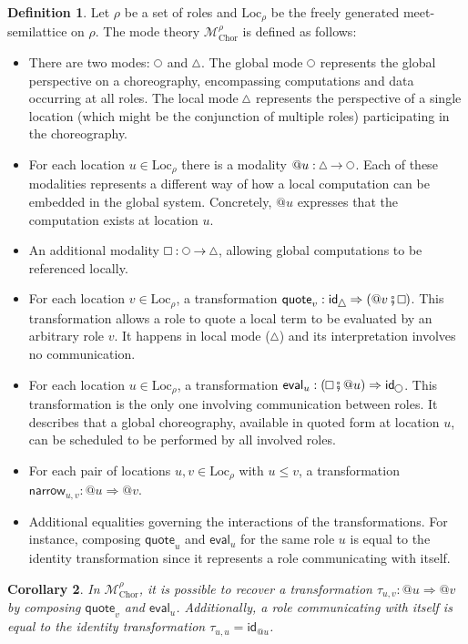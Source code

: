 \documentclass{scrartcl}
\theoremstyle{definition}
\newtheorem{definition}{Definition}
\theoremstyle{plain}
\newtheorem{corollary}[definition]{Corollary}
\renewcommand{\square}%
  {\tikz{\draw (0,0) rectangle (0.2cm,0.2cm);}}
\renewcommand{\circle}%
  {\tikz{\draw (0,0) circle [radius=0.1cm];}}
\renewcommand{\triangle}%
  {\tikz{\draw (0,0) -- (0.2cm,0) -- (0.1cm,0.2cm) -- (0,0);}}
\begin{document}
\begin{definition}
Let $\rho$ be a set of roles and $\textrm{Loc}_\rho$ be the freely generated
meet-semilattice on $\rho$. The mode theory $\mathcal{M}^\rho_{\textrm{Chor}}$
is defined as follows:
\begin{itemize}
\item
  There are two modes: $\circle$ and $\triangle$. The global mode $\circle$
  represents the global perspective on a choreography, encompassing
  computations and data occurring at all roles. The local mode $\triangle$
  represents the perspective of a single location (which might be the
  conjunction of multiple roles) participating in the choreography.
\item
  For each location $u \in \textrm{Loc}_\rho$ there is a modality $@u :
  \triangle \to \circle$. Each of these modalities represents a different way
  of how a local computation can be embedded in the global system. Concretely,
  $@u$ expresses that the computation exists at location $u$.
\item
  An additional modality $\square : \circle \to \triangle$, allowing global
  computations to be referenced locally.
\item
  For each location $v \in \textrm{Loc}_\rho$, a transformation
  $\textsf{quote}_v : \textsf{id}_{\triangle} \Rightarrow ({}@ v \fatsemi
  \square)$. This transformation allows a role to quote a local term to be
  evaluated by an arbitrary role $v$. It happens in local mode ($\triangle$)
  and its interpretation involves no communication.
\item
  For each location $u \in \textrm{Loc}_\rho$, a transformation
  $\textsf{eval}_u : (\square \fatsemi {}@ u) \Rightarrow
  \textsf{id}_{\circle}$. This transformation is the only one involving
  communication between roles. It describes that a global choreography,
  available in quoted form at location $u$, can be scheduled to be performed by
  all involved roles.
\item
  For each pair of locations $u, v \in \textrm{Loc}_\rho$ with $u \leq v$, a
  transformation $\textsf{narrow}_{u,v} : @u \Rightarrow @v$.
\item
  Additional equalities governing the interactions of the transformations. For
  instance, composing $\textsf{quote}_u$ and $\textsf{eval}_u$ for the same
  role $u$ is equal to the identity transformation since it represents a
  role communicating with itself.
\end{itemize}
\end{definition}
\begin{corollary}
  In {\upshape$\mathcal{M}^{\rho}_{\textrm{Chor}}$}, it is possible to recover
  a transformation $\tau_{u,v} : @u \Rightarrow @v$ by composing
  {\upshape$\textsf{quote}_v$} and {\upshape$\textsf{eval}_u$}. Additionally, a
  role communicating with itself is equal to the identity transformation
  {\upshape$\tau_{u,u} = \textsf{id}_{@u}$}.
\end{corollary}
\end{document}
